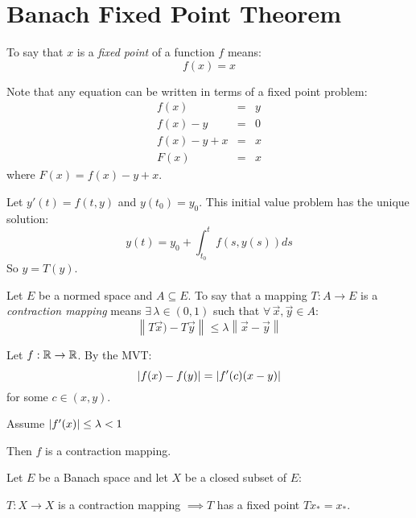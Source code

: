 \documentclass[letterpaper,12pt,fleqn]{article}
\renewcommand{\l}{\lambda}
\newcommand{\vx}{\vec{x}}
\newcommand{\vy}{\vec{y}}
\newcommand{\norm}[1]{\left\|#1\right\|}
\begin{document}
\section*{Banach Fixed Point Theorem}

\begin{definition}
  To say that $x$ is a \emph{fixed point} of a function $f$ means:
  \[f(x)=x\]
\end{definition}

Note that any equation can be written in terms of a fixed point problem:
\begin{eqnarray*}
  f(x) &=& y \\
  f(x)-y &=& 0 \\
  f(x)-y+x &=& x \\
  F(x) &=& x
\end{eqnarray*}
where $F(x)=f(x)-y+x$.

\begin{example}
  Let $y'(t)=f(t,y)$ and $y(t_0)=y_0$. This initial value problem has the
  unique solution:
  \[y(t)=y_0+\int_{t_0}^tf(s,y(s))ds\]
  So $y=T(y)$.
\end{example}

\begin{definition}
  Let $E$ be a normed space and $A\subseteq E$. To say that a mapping
  $T:A\to E$ is a \emph{contraction mapping} means $\exists\,\l\in(0,1)$ such
  that $\forall\,\vx,\vy\in A$:
  \[\norm{T\vx)-T\vy}\le\l\norm{\vx-\vy}\]
\end{definition}

\begin{example}
  Let $f:\mathbb{R}\to\mathbb{R}$. By the MVT:
  \[\lvert f(x)-f(y)\rvert=\lvert f'(c)(x-y)\rvert\]
  for some $c\in(x,y)$.

  Assume $\abs{f'(x)}\le\l<1$

  Then $f$ is a contraction mapping.
\end{example}

\begin{theorem}
  Let $E$ be a Banach space and let $X$ be a closed subset of $E$:

  \qquad$T:X\to X$ is a contraction mapping $\implies T$ has a fixed point
  $Tx_*=x_*$.
\end{theorem}
\end{document}
